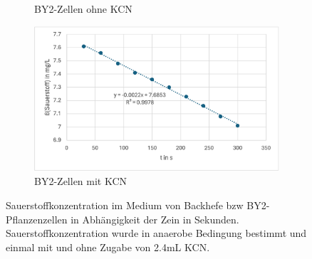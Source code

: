 \documentclass[10pt,a4paper]{article}
\begin{document}
\begin{figure}[H]
\begin{subfigure}[b]{0.5\textwidth}
			\caption{BY2-Zellen ohne KCN}
			\label{fig:BY2ohneKCN}
		\end{subfigure}
		\hfill
		\begin{subfigure}[b]{0.5\textwidth}
			\includegraphics[width=\textwidth]{O2BY2mitKCN.png}
			\caption{BY2-Zellen mit KCN}
			\label{fig:BY2mitKCN}
		\end{subfigure}
		\caption{Sauerstoffkonzentration im Medium von Backhefe bzw BY2-Pflanzenzellen in Abhängigkeit der Zein in Sekunden. Sauerstoffkonzentration wurde in anaerobe Bedingung bestimmt und einmal mit und ohne Zugabe von 2.4mL KCN.}
		\label{fig: Sauerstoffverbrauch}
	\end{figure}
	
	
\end{document}
